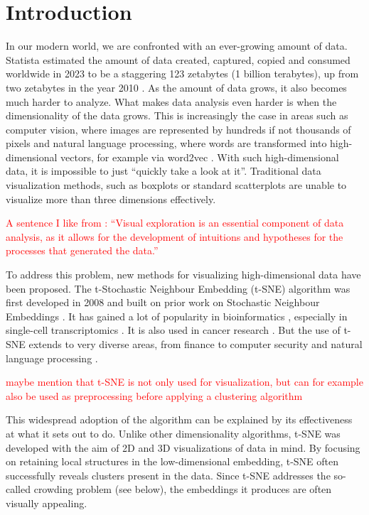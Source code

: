 \chapter{Introduction}

In our modern world, we are confronted with an ever-growing amount of data. 
Statista estimated the amount of data created, captured, copied and consumed worldwide in 2023 to be a staggering 123 zetabytes (1 billion terabytes), up from two zetabytes in the year 2010 \cite{Statista}.
As the amount of data grows, it also becomes much harder to analyze. 
What makes data analysis even harder is when the dimensionality of the data grows. 
This is increasingly the case in areas such as computer vision, where images are represented by hundreds if not thousands of pixels and natural language processing, where words are transformed into high-dimensional vectors, for example via word2vec \cite{word2vec}.
With such high-dimensional data, it is impossible to just \enquote{quickly take a look at it}. 
Traditional data visualization methods, such as boxplots or standard scatterplots are unable to visualize more than three dimensions effectively. 

\textcolor{red}{A sentence I like from \cite{vdMaa14}: \enquote{Visual exploration is an essential component of data analysis, as it allows for the development of intuitions and hypotheses for the processes that generated the data.}}

To address this problem, new methods for visualizing high-dimensional data have been proposed. 
The t-Stochastic Neighbour Embedding (t-SNE) algorithm was first developed in 2008 \cite{vdMaa08} and built on prior work on Stochastic Neighbour Embeddings \cite{Hinton02}. 
It has gained a lot of popularity in bioinformatics \cite{BioInfo1, BioInfo2, BioInfo3}, especially in  single-cell transcriptomics \cite{Macosko_dataset, tasic18, cao19}. 
It is also used in cancer research \cite{cancer1, cancer2, cancer3}.  
But the use of t-SNE extends to very diverse areas, from finance \cite{Finance} to computer security \cite{Security1, Security2, Security3} and natural language processing \cite{NLP1,NLP2, NLP3}. 

\textcolor{red}{maybe mention that t-SNE is not only used for visualization, but can for example also be used as preprocessing before applying a clustering algorithm}

This widespread adoption of the algorithm can be explained by its effectiveness at what it sets out to do. Unlike other dimensionality algorithms, t-SNE was developed with the aim of 2D and 3D visualizations of data in mind. 
By focusing on retaining local structures in the low-dimensional embedding, t-SNE often successfully reveals clusters present in the data. 
Since t-SNE addresses the so-called crowding problem (see below), the embeddings it produces are often visually appealing.  

